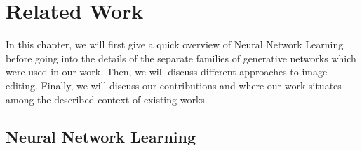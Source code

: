 
\chapter{Related Work}
\label{chapter:related}



















In this chapter, we will first give a quick overview of Neural Network Learning before 
going into the details of the separate families of generative networks which were used in our work. 
Then, we will discuss different approaches to image editing. Finally, we will discuss our contributions 
and where our work situates among the described context of existing works. 

\section{Neural Network Learning}

